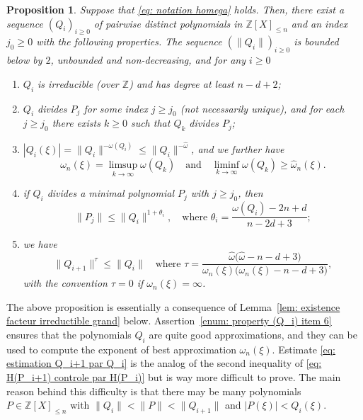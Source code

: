 \documentclass[10pt,a4paper]{amsart}
\numberwithin{equation}{section}
\newcommand\bZ{\mathbb{Z}}
\newcommand\homega{\widehat{\omega}}\newcommand\HH{\mathcal{H}}
\newcommand{\normH}[1]{\|#1\|}
\newcommand\AND{\quad\text{and}\quad}
\theoremstyle{definition}
\theoremstyle{plain}
\newtheorem{Prop}[Def]{Proposition}
\begin{document}
\begin{Prop}
\label{prop: existence Qi}
Suppose that \eqref{eq: notation homega} holds. Then, there exist a sequence $(Q_i)_{i\geq 0}$ of pairwise distinct polynomials in $\bZ[X]_{\leq n}$ and an index $j_0\geq 0$ with the following properties. The sequence $(\normH{Q_i})_{i\geq 0}$ is bounded below by $2$, unbounded and non-decreasing, and for any $i\geq 0$
\begin{enumerate}
\item \label{enum: property (Q_i) item 1} $Q_i$ is irreducible (over $\bZ$) and has degree at least $n-d+2$;
\item $Q_i$ divides $P_j$ for some index $j\geq j_0$ (not necessarily unique), and for each $j\geq j_0$ there exists $k\geq 0$ such that $Q_k$ divides $P_j$;
\item \label{enum: property (Q_i) item 6} $|Q_i(\xi)| = \normH{Q_i}^{-\omega(Q_i)}\leq \normH{Q_i}^{-\homega}$, and we further have
\begin{equation}
\label{eq: omega_n donné par les Q_i}
\omega_n(\xi) = \limsup_{k\to \infty} \omega(Q_k) \AND \liminf_{k\to \infty} \omega(Q_k) \geq \homega_n(\xi).
\end{equation}
\item \label{enum: H(P_j) controle par H(Q_i)} if $Q_i$ divides a minimal polynomial $P_j$ with $j\geq j_0$, then
\begin{equation}
\label{eq: premiere estimation Pj vs Qi}
\normH{P_j} \leq \normH{Q_i}^{1+\theta_i}, \quad \textrm{where } \theta_i = \frac{\omega(Q_i)-2n+d}{n-2d+3};
\end{equation}
\item \label{enum: H(Q_i+1) controle par H(Q_i)} we have
\begin{equation}
\label{eq: estimation Q_i+1 par Q_i}
\normH{Q_{i+1}}^\tau \leq \normH{Q_i} \quad \textrm{where } \tau = \frac{\homega\big(\homega -n-d+3\big)}{\omega_n(\xi)\big(\omega_n(\xi)-n-d+3\big)},
\end{equation}
with the convention $\tau= 0$ if $\omega_n(\xi) = \infty$.
\end{enumerate}
\end{Prop}

The above proposition is essentially a consequence of Lemma~\ref{lem: existence facteur irreductible grand} below. Assertion~\eqref{enum: property (Q_i) item 6} ensures that the polynomials $Q_i$ are quite good approximations, and they can be used to compute the exponent of best approximation $\omega_n(\xi)$. Estimate \eqref{eq: estimation Q_i+1 par Q_i} is the analog of the second inequality of \eqref{eq: H(P_i+1) controle par H(P_i)} but is way more difficult to prove. The main reason behind this difficulty is that there may be many polynomials $P\in\bZ[X]_{\leq n}$ with $\normH{Q_i} < \normH{P} < \normH{Q_{i+1}}$ and $|P(\xi)| < Q_i(\xi)$.
\end{document}
